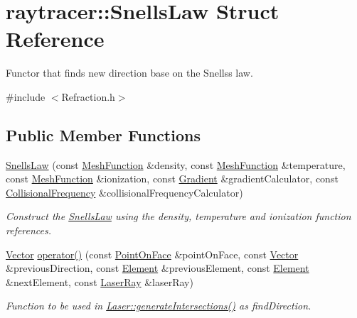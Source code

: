 \hypertarget{structraytracer_1_1SnellsLaw}{}\section{raytracer\+:\+:Snells\+Law Struct Reference}
\label{structraytracer_1_1SnellsLaw}


Functor that finds new direction base on the Snells\textquotesingle{}s law.  




{\ttfamily \#include $<$Refraction.\+h$>$}

\subsection*{Public Member Functions}
\begin{DoxyCompactItemize}
\item 
\hyperlink{structraytracer_1_1SnellsLaw_a523a0d929eaaa78ea11bed701cac2d9d}{Snells\+Law} (const \hyperlink{classraytracer_1_1MeshFunction}{Mesh\+Function} \&density, const \hyperlink{classraytracer_1_1MeshFunction}{Mesh\+Function} \&temperature, const \hyperlink{classraytracer_1_1MeshFunction}{Mesh\+Function} \&ionization, const \hyperlink{classraytracer_1_1Gradient}{Gradient} \&gradient\+Calculator, const \hyperlink{classraytracer_1_1CollisionalFrequency}{Collisional\+Frequency} \&collisional\+Frequency\+Calculator)
\begin{DoxyCompactList}\small\item\em Construct the \hyperlink{structraytracer_1_1SnellsLaw}{Snells\+Law} using the density, temperature and ionization function references. \end{DoxyCompactList}\item 
\hyperlink{classraytracer_1_1Vector}{Vector} \hyperlink{structraytracer_1_1SnellsLaw_ab1af745f1e3b826546eff6d938b33982}{operator()} (const \hyperlink{structraytracer_1_1PointOnFace}{Point\+On\+Face} \&point\+On\+Face, const \hyperlink{classraytracer_1_1Vector}{Vector} \&previous\+Direction, const \hyperlink{classraytracer_1_1Element}{Element} \&previous\+Element, const \hyperlink{classraytracer_1_1Element}{Element} \&next\+Element, const \hyperlink{classraytracer_1_1LaserRay}{Laser\+Ray} \&laser\+Ray)
\begin{DoxyCompactList}\small\item\em Function to be used in \hyperlink{classraytracer_1_1Laser_a40fd2b112fb1de646861d7e93ac303e3}{Laser\+::generate\+Intersections()} as find\+Direction. \end{DoxyCompactList}\end{DoxyCompactItemize}


